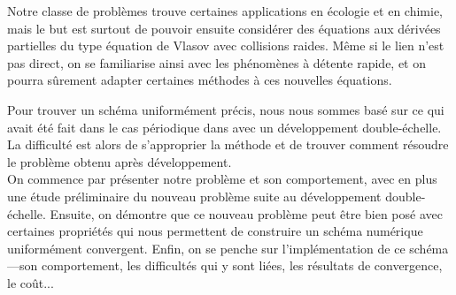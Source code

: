 Notre classe de problèmes trouve certaines applications en écologie et en chimie, mais le but est surtout de pouvoir ensuite considérer des équations aux dérivées partielles du type équation de Vlasov avec collisions raides. 
Même si le lien n'est pas direct, on se familiarise ainsi avec les phénomènes à détente rapide, et on pourra sûrement adapter certaines méthodes à ces nouvelles équations. 

Pour trouver un schéma uniformément précis, nous nous sommes basé sur ce qui avait été fait dans le cas périodique dans \cite{chartier2015UA} avec un développement double-échelle. 
La difficulté est alors de s'approprier la méthode et de trouver comment résoudre le problème obtenu après développement. \\


On commence par présenter notre problème et son comportement, avec en plus une étude préliminaire du nouveau problème suite au développement double-échelle. 
Ensuite, on démontre que ce nouveau problème peut être bien posé avec certaines propriétés qui nous permettent de construire un schéma numérique uniformément convergent. 
Enfin, on se penche sur l'implémentation de ce schéma ---son comportement, les difficultés qui y sont liées, les résultats de convergence, le coût... 